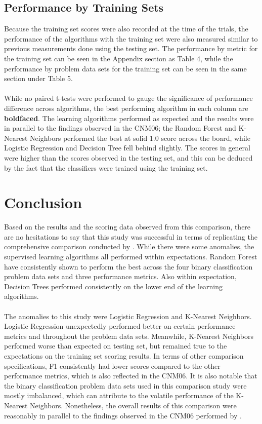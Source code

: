 \documentclass[twoside,11pt]{article}
\begin{document}
\subsection{Performance by Training Sets}

Because the training set scores were also recorded at the time of the trials, 
the performance of the algorithms with the training set were also measured similar 
to previous measurements done using the testing set. The performance by metric for
the training set can be seen in the Appendix section as Table 4, while the 
performance by problem data sets for the training set can be seen in the same 
section under Table 5. \\
\\
While no paired t-tests were performed to gauge the significance of performance 
difference across algorithms, the best performing algorithm in each column are 
\textbf{boldfaced}. The learning algorithms performed as expected and the 
results were in parallel to the findings observed in the CNM06; the Random 
Forest and K-Nearest Neighbors performed the best at solid 1.0 score across 
the board, while Logistic Regression and Decision Tree fell behind slightly. 
The scores in general were higher than the scores observed in the testing set, 
and this can be deduced by the fact that the classifiers were trained using 
the training set.

\section{Conclusion}

Based on the results and the scoring data observed from this comparison, 
there are no hesitations to say that this study was successful in terms of 
replicating the comprehensive comparison conducted by \citeauthor{cnm:06}.
While there were some anomalies, the supervised learning algorithms all 
performed within expectations. Random Forest have consistently shown to 
perform the best across the four binary classification problem data sets 
and three performance metrics. Also within expectation, Decision Trees 
performed consistently on the lower end of the learning algorithms. \\ 
\\
The anomalies to this study were Logistic Regression and K-Nearest Neighbors.
Logistic Regression unexpectedly performed better on certain performance 
metrics and throughout the problem data sets. Meanwhile, K-Nearest Neighbors 
performed worse than expected on testing set, but remained true to the 
expectations on the training set scoring results. In terms of other 
comparison specifications, F1 consistently had lower scores compared to 
the other performance metrics, which is also reflected 
in the CNM06. It is also notable that the binary classification problem 
data sets used in this comparison study were mostly imbalanced, which can 
attribute to the volatile performance of the K-Nearest Neighbors. 
Nonetheless, the overall results of this comparison were reasonably in 
parallel to the findings observed in the CNM06 performed by \citet{cnm:06}.\\
\end{document}
